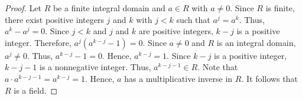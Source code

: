 \documentclass[12pt]{article}
\begin{document}
\begin{proof}
Let $R$ be a finite integral domain and $a \in R$ with $a \neq 0$.  Since $R$ is finite, there exist positive integers $j$ and $k$ with $j<k$ such that $a^j=a^k$.  Thus, $a^k-a^j=0$.  Since $j<k$ and $j$ and $k$ are positive integers, $k-j$ is a positive integer.  Therefore, $a^j(a^{k-j}-1)=0$.  Since $a \neq 0$ and $R$ is an integral domain, $a^j \neq 0$.  Thus, $a^{k-j}-1=0$.  Hence, $a^{k-j}=1$.  Since $k-j$ is a positive integer, $k-j-1$ is a nonnegative integer.  Thus, $a^{k-j-1} \in R$.  Note that $a \cdot a^{k-j-1}=a^{k-j}=1$.  Hence, $a$ has a multiplicative inverse in $R$.  It follows that $R$ is a field.
\end{proof}
\end{document}
